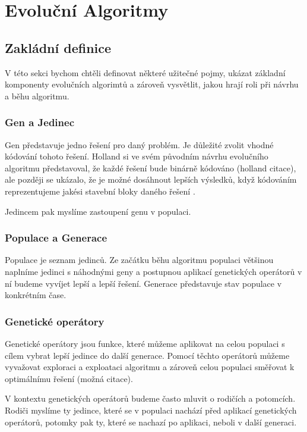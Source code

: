 \chapter{Evoluční Algoritmy}


\section{Zakládní definice}
V této sekci bychom chtěli definovat některé užitečné pojmy, ukázat základní komponenty evolučních algorimtů a zároveň vysvětlit, jakou hrají roli při návrhu a běhu algoritmu.

\subsection{Gen a Jedinec}
Gen představuje jedno řešení pro daný problém. Je důležité zvolit vhodné kódování tohoto řešení. Holland si ve svém původním návrhu evolučního algoritmu představoval, že každé řešení bude binárně kódováno (holland citace), ale později se ukázalo, že je možné dosáhnout lepších výsledků, když kódováním reprezentujeme jakési stavební bloky daného řešení \citet{HeadlessChicken}.

Jedincem pak myslíme zastoupení genu v populaci.

\subsection{Populace a Generace}
Populace je seznam jedinců. Ze začátku běhu algoritmu populaci většinou naplníme jedinci s náhodnými geny a postupnou aplikací genetických operátorů v ní budeme vyvíjet lepší a lepší řešení. Generace představuje stav populace v konkrétním čase.

\subsection{Genetické operátory}
Genetické operátory jsou funkce, které můžeme aplikovat na celou populaci s cílem vybrat lepší jedince do další generace. Pomocí těchto operátorů můžeme vyvažovat exploraci a exploataci algoritmu a zároveň celou populaci směřovat k optimálnímu řešení (možná citace).

V kontextu genetických operátorů budeme často mluvit o rodičích a potomcích. Rodiči myslíme ty jedince, které se v populaci nachází před aplikací genetických operátorů, potomky pak ty, které se nachazí po aplikaci, neboli v další generaci. 

